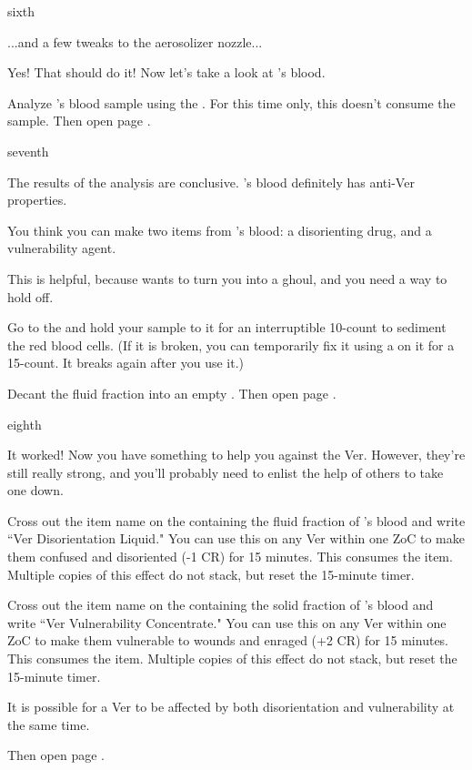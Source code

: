 \documentclass[greennotebook]{guildcamp4} %
\begin{document}
\begin{page}{sixth}

...and a few tweaks to the aerosolizer nozzle...

Yes! That should do it! Now let's take a look at \cPlead{}'s blood.

Analyze \cPlead{}'s blood sample using the \sBloodAnalyzer{}. For this time only, this doesn't consume the sample. Then open page .

\end{page}

\begin{page}{seventh}

The results of the analysis are conclusive. \cPlead{}'s blood definitely has anti-Ver properties. 

You think you can make two items from \cPlead{}'s blood: a disorienting drug, and a vulnerability agent. 

This is helpful, because \cVone{} wants to turn you into a ghoul, and you need a way to hold \cVone{\them} off.

Go to the \sCentrifuge{} and hold your sample to it for an interruptible 10-count to sediment the red blood cells. (If it is broken, you can temporarily fix it using a \iWrench{} on it for a 15-count. It breaks again after you use it.)

Decant the fluid fraction into an empty \iTestTube{}. Then open page .

\end{page}

\begin{page}{eighth}

It worked! Now you have something to help you against the Ver. However, they're still really strong, and you'll probably need to enlist the help of others to take one down.

Cross out the item name on the \iTestTube{} containing the fluid fraction of \cPlead{}'s blood and write ``Ver Disorientation Liquid." You can use this on any Ver within one ZoC to make them confused and disoriented (-1 CR) for 15 minutes. This consumes the item. Multiple copies of this effect do not stack, but reset the 15-minute timer.

Cross out the item name on the \iTestTube{} containing the solid fraction of \cPlead{}'s blood and write ``Ver Vulnerability Concentrate." You can use this on any Ver within one ZoC to make them vulnerable to wounds and enraged (+2 CR) for 15 minutes. This consumes the item. Multiple copies of this effect do not stack, but reset the 15-minute timer.

It is possible for a Ver to be affected by both disorientation and vulnerability at the same time.

Then open page .

\end{page}
\end{document}
